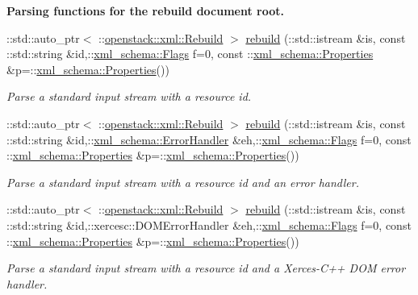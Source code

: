 \begin{Indent}{\bf Parsing functions for the rebuild document root.}
\begin{DoxyCompactItemize}
::std::auto\_\-ptr$<$ ::\hyperlink{classopenstack_1_1xml_1_1Rebuild}{openstack::xml::Rebuild} $>$ \hyperlink{namespaceopenstack_1_1xml_a51bb43bead972dcdca3051532f437984}{rebuild} (::std::istream \&is, const ::std::string \&id,::\hyperlink{namespacexml__schema_affb4c227cbd9aa7453dd1dc5a1401943}{xml\_\-schema::Flags} f=0, const ::\hyperlink{namespacexml__schema_ad27ce19a7ee1d3b1064092648898f64c}{xml\_\-schema::Properties} \&p=::\hyperlink{namespacexml__schema_ad27ce19a7ee1d3b1064092648898f64c}{xml\_\-schema::Properties}())
\begin{DoxyCompactList}\small\item\em Parse a standard input stream with a resource id. \item\end{DoxyCompactList}\item 
::std::auto\_\-ptr$<$ ::\hyperlink{classopenstack_1_1xml_1_1Rebuild}{openstack::xml::Rebuild} $>$ \hyperlink{namespaceopenstack_1_1xml_a29a37bc0890bb6c6d077b6e67cca1e31}{rebuild} (::std::istream \&is, const ::std::string \&id,::\hyperlink{namespacexml__schema_ab1c9361bfd3b404eaabf0c31eded79dc}{xml\_\-schema::ErrorHandler} \&eh,::\hyperlink{namespacexml__schema_affb4c227cbd9aa7453dd1dc5a1401943}{xml\_\-schema::Flags} f=0, const ::\hyperlink{namespacexml__schema_ad27ce19a7ee1d3b1064092648898f64c}{xml\_\-schema::Properties} \&p=::\hyperlink{namespacexml__schema_ad27ce19a7ee1d3b1064092648898f64c}{xml\_\-schema::Properties}())
\begin{DoxyCompactList}\small\item\em Parse a standard input stream with a resource id and an error handler. \item\end{DoxyCompactList}\item 
::std::auto\_\-ptr$<$ ::\hyperlink{classopenstack_1_1xml_1_1Rebuild}{openstack::xml::Rebuild} $>$ \hyperlink{namespaceopenstack_1_1xml_a36b956f07d39925ff37d0afcd78393d1}{rebuild} (::std::istream \&is, const ::std::string \&id,::xercesc::DOMErrorHandler \&eh,::\hyperlink{namespacexml__schema_affb4c227cbd9aa7453dd1dc5a1401943}{xml\_\-schema::Flags} f=0, const ::\hyperlink{namespacexml__schema_ad27ce19a7ee1d3b1064092648898f64c}{xml\_\-schema::Properties} \&p=::\hyperlink{namespacexml__schema_ad27ce19a7ee1d3b1064092648898f64c}{xml\_\-schema::Properties}())
\begin{DoxyCompactList}\small\item\em Parse a standard input stream with a resource id and a Xerces-\/C++ DOM error handler. \item\end{DoxyCompactList}\item 

\end{DoxyCompactItemize}
\end{Indent}
